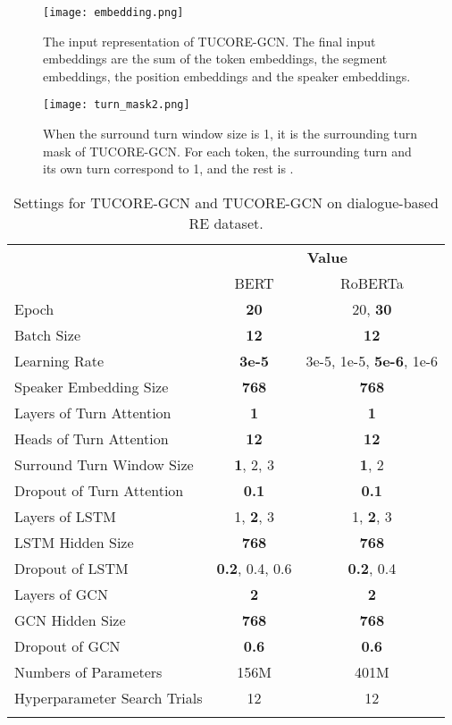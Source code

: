 \documentclass[11pt]{article}
\begin{document}
\begin{figure*}
\begin{center}
\texttt{[image: embedding.png]}
\end{center}
\caption{The input representation of TUCORE-GCN. The final input embeddings are the sum of the token embeddings, the segment embeddings, the position embeddings and the speaker embeddings.}
\label{fig:speaker embedding}
\end{figure*}

\begin{figure}
\begin{center}
\texttt{[image: turn\_mask2.png]}
\end{center}
\caption{When the surround turn window size is 1, it is the surrounding turn mask of TUCORE-GCN. For each token, the surrounding turn and its own turn correspond to 1, and the rest is .}
\label{fig:turn mask}
\end{figure}

\begin{table}
\centering
{\scriptsize
\begin{tabular}{l|c|c}
\Xhline{3\arrayrulewidth}
\multirow{2}{*}{\textbf{Hyperparameter}} & \multicolumn{2}{c}{\textbf{Value}}\\\cline{2-3}
& BERT & RoBERTa\\
\Xhline{3\arrayrulewidth}
Epoch & \textbf{20} & 20, \textbf{30} \\ 
Batch Size & \textbf{12} & \textbf{12} \\
Learning Rate & \textbf{3e-5} & 3e-5, 1e-5, \textbf{5e-6}, 1e-6 \\
Speaker Embedding Size & \textbf{768} & \textbf{768} \\
Layers of Turn Attention & \textbf{1} & \textbf{1} \\
Heads of Turn Attention & \textbf{12} & \textbf{12} \\
Surround Turn Window Size & \textbf{1}, 2, 3 & \textbf{1}, 2 \\
Dropout of Turn Attention & \textbf{0.1} & \textbf{0.1} \\
Layers of LSTM & 1, \textbf{2}, 3 & 1, \textbf{2}, 3 \\
LSTM Hidden Size & \textbf{768} & \textbf{768} \\
Dropout of LSTM & \textbf{0.2}, 0.4, 0.6 & \textbf{0.2}, 0.4 \\
Layers of GCN & \textbf{2} & \textbf{2} \\
GCN Hidden Size & \textbf{768} & \textbf{768}\\
Dropout of GCN & \textbf{0.6} & \textbf{0.6} \\
\hline
\hline
Numbers of Parameters & 156M & 401M \\
Hyperparameter Search Trials & 12 & 12 \\
\Xhline{3\arrayrulewidth}
\end{tabular}
}
\caption{\label{Setting_dialogRE}Settings for TUCORE-GCN and TUCORE-GCN on dialogue-based RE dataset.}
\end{table}
\end{document}
